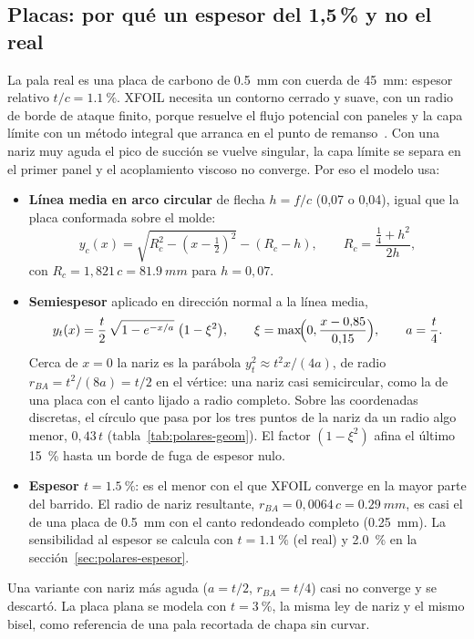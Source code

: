 \subsection{Placas: por qué un espesor del 1,5\,\% y no el real}
La pala real es una placa de carbono de \SI{0.5}{mm} con cuerda de \SI{45}{mm}: espesor
relativo $t/c=\SI{1.1}{\percent}$. XFOIL necesita un contorno cerrado y suave, con un
radio de borde de ataque finito, porque resuelve el flujo potencial con paneles y la capa
límite con un método integral que arranca en el punto de remanso~\cite{polares-drela1989}.
Con una nariz muy aguda el pico de succión se vuelve singular, la capa límite se separa en
el primer panel y el acoplamiento viscoso no converge. Por eso el modelo usa:
\begin{itemize}
  \item \textbf{Línea media en arco circular} de flecha $h=f/c$ (0,07 o 0,04), igual que
        la placa conformada sobre el molde:
        \begin{equation}
          y_c(x)=\sqrt{R_c^2-(x-\tfrac12)^2}-(R_c-h),\qquad
          R_c=\frac{\tfrac14+h^2}{2h},
          \label{eq:polares-arco}
        \end{equation}
        con $R_c=1{,}821\,c=\SI{81.9}{mm}$ para $h=0{,}07$.
  \item \textbf{Semiespesor} aplicado en dirección normal a la línea media,
        \begin{equation}
          y_t(x)=\frac t2\,\sqrt{1-e^{-x/a}}\;\bigl(1-\xi^2\bigr),\qquad
          \xi=\max\!\Bigl(0,\frac{x-0{,}85}{0{,}15}\Bigr),\qquad a=\frac t4 .
          \label{eq:polares-espesor}
        \end{equation}
        Cerca de $x=0$ la nariz es la parábola $y_t^2\approx t^2x/(4a)$, de radio
        $r_{BA}=t^2/(8a)=t/2$ en el vértice: una nariz casi semicircular, como la de una
        placa con el canto lijado a radio completo. Sobre las coordenadas discretas, el
        círculo que pasa por los tres puntos de la nariz da un radio algo menor,
        $0{,}43\,t$ (tabla~\ref{tab:polares-geom}). El factor $(1-\xi^2)$ afina el último \SI{15}{\percent}
        hasta un borde de fuga de espesor nulo.
  \item \textbf{Espesor $t=\SI{1.5}{\percent}$}: es el menor con el que XFOIL converge en
        la mayor parte del barrido. El radio de nariz resultante,
        $r_{BA}=0{,}0064\,c=\SI{0.29}{mm}$, es casi el de una placa de \SI{0.5}{mm} con el
        canto redondeado completo (\SI{0.25}{mm}). La sensibilidad al espesor se calcula
        con $t=\SI{1.1}{\percent}$ (el real) y \SI{2.0}{\percent} en la
        sección~\ref{sec:polares-espesor}.
\end{itemize}
Una variante con nariz más aguda ($a=t/2$, $r_{BA}=t/4$) casi no converge y se descartó.
La placa plana se modela con $t=\SI{3}{\percent}$, la misma ley de nariz y el mismo bisel,
como referencia de una pala recortada de chapa sin curvar.

